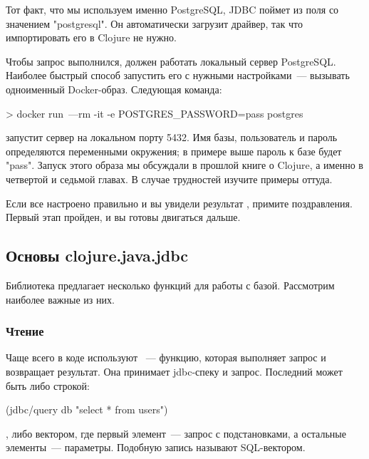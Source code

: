 Тот факт, что мы используем именно PostgreSQL, JDBC поймет из поля  со значением "postgresql". Он автоматически загрузит драйвер, так что импортировать его в Clojure не нужно.

Чтобы запрос выполнился, должен работать локальный сервер PostgreSQL. Наиболее быстрый способ запустить его с нужными настройками~--- вызывать одноименный Docker-образ. Следующая команда:

\begin{english}
  \begin{bash}
> docker run~---rm -it -e POSTGRES_PASSWORD=pass postgres
  \end{bash}
\end{english}

запустит сервер на локальном порту 5432. Имя базы, пользователь и пароль определяются переменными окружения; в примере выше пароль к базе будет "pass". Запуск этого образа мы обсуждали в прошлой книге о Clojure, а именно в четвертой и седьмой главах. В случае трудностей изучите примеры оттуда.

Если все настроено правильно и вы увидели результат , примите поздравления. Первый этап пройден, и вы готовы двигаться дальше.

\subsection{Основы clojure.java.jdbc}

Библиотека предлагает несколько функций для работы с базой. Рассмотрим наиболее важные из них.

\subsubsection{Чтение}

Чаще всего в коде используют ~--- функцию, которая выполняет запрос и возвращает результат. Она принимает jdbc-спеку и запрос. Последний может быть либо строкой:

\begin{english}
  \begin{clojure}
(jdbc/query db "select * from users")
  \end{clojure}
\end{english}

\noindent
, либо вектором, где первый элемент~--- запрос с подстановками, а остальные элементы~--- параметры. Подобную запись называют SQL-вектором.

